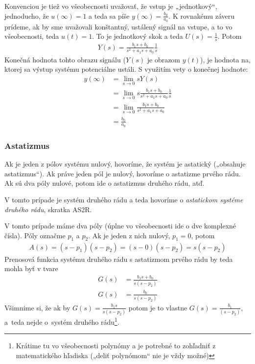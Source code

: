 \documentclass[a4paper, 10pt, ]{article}
\begin{document}
Konvenciou je tiež vo všeobecnosti uvažovať, že vstup je „jednotkový“, jednoducho, že $u(\infty) = 1$ a teda sa píše $y(\infty) = \frac{b_0 }{a_0}$. K rovnakému záveru prídeme, ak by sme uvažovali konštantný, ustálený signál na vstupe, a to vo všeobecnosti, teda $u(t) = 1$. To je jednotkový skok a teda $U(s) = \frac{1}{s}$. Potom
\begin{align}
    Y(s) = \frac{b_1 s + b_0}{s^2 + a_1 s + a_0} \frac{1}{s}
\end{align}
Konečná hodnota tohto obrazu signálu ($Y(s)$ je obrazom $y(t)$), je hodnota na, ktorej sa výstup systému potenciálne ustáli. S využitím vety o konečnej hodnote:
\begin{subequations}
    \begin{align}
        y(\infty) &= \lim_{s \to 0} s Y(s) \\
        &= \lim_{s \to 0} s \frac{b_1 s + b_0}{s^2 + a_1 s + a_0} \frac{1}{s} \\
        &= \lim_{s \to 0} \frac{b_1 s + b_0}{s^2 + a_1 s + a_0} \\
        &= \frac{b_0}{a_0}
    \end{align}
\end{subequations}



\subsubsection{Astatizmus}

Ak je jeden z pólov systému nulový, hovoríme, že systém je astatický („obsahuje astatizmus“). Ak práve jeden pól je nulový, hovoríme o astatizme prvého rádu. Ak sú dva póly nulové, potom ide o astatizmus druhého rádu, atď.

V tomto prípade je systém druhého rádu a teda hovoríme o \emph{astatickom systéme druhého rádu}, skratka AS2R.

V tomto prípade máme dva póly (úplne vo všeobecnosti ide o dve komplexné čísla). Póly označme $p_1$ a $p_2$. Ak je jeden z nich nulový, $p_1 = 0$, potom
\begin{align}
    A(s) = (s - p_1)(s - p_2) = (s -0)(s - p_2) = s(s - p_2)
\end{align}
Prenosová funkcia systému druhého rádu s astatizmom prvého rádu by teda mohla byť v tvare
\begin{subequations}
    \begin{align}
        G(s) &= \frac{b_1 s + b_0}{s(s - p_2)} \\
        G(s) &= \frac{b_0}{s(s - p_2)}
    \end{align}
\end{subequations}
Všimnime si, že ak by $G(s) = \frac{b_1 s}{s(s - p_2)}$ potom je to vlastne $G(s) = \frac{b_1}{(s - p_2)}$, a~teda nejde o~systém druhého rádu\footnote{Krátime tu vo všeobecnosti polynómy a je potrebné to zohľadniť z matematického hľadiska („deliť polynómom“ nie je vždy možné)}.
\end{document}
